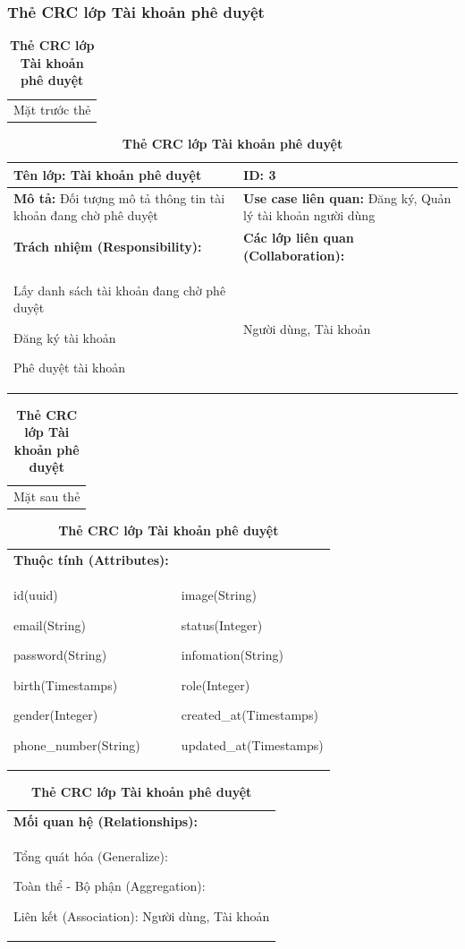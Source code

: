 \subsubsection{Thẻ CRC lớp Tài khoản phê duyệt}
  \begin{table}[H]
    \caption{\bfseries \fontsize{12pt}{0pt}\selectfont Thẻ CRC lớp Tài khoản phê duyệt}
    \centering
    \begin{tabularx}{0.9\textwidth}{X}
      Mặt trước thẻ
    \end{tabularx}
    \begin{tabularx}{0.9\textwidth}{|X|X|}
      \hline
      \textbf{Tên lớp:} Tài khoản phê duyệt & \textbf{ID:} 3 \\
      \hline
      \textbf{Mô tả:} Đối tượng mô tả thông tin tài khoản đang chờ phê duyệt & \textbf{Use case liên quan:} Đăng ký, Quản lý tài khoản người dùng \\
      \hline
      \textbf{Trách nhiệm (Responsibility):} & \textbf{Các lớp liên quan (Collaboration):} \\
      Lấy danh sách tài khoản đang chờ phê duyệt
      
      Đăng ký tài khoản

      Phê duyệt tài khoản
      & 
      Người dùng, Tài khoản
      \\
      \hline
    \end{tabularx}
    \begin{tabularx}{0.9\textwidth}{X}
      Mặt sau thẻ
    \end{tabularx}
    \begin{tabularx}{0.9\textwidth}{|X|X|}
      \hline
      \textbf{Thuộc tính (Attributes):} & \\
      id(uuid) 
      
      email(String)

      password(String)

      birth(Timestamps)

      gender(Integer)

      phone\_number(String)
      &
      image(String)

      status(Integer)

      infomation(String)

      role(Integer)

      created\_at(Timestamps)

      updated\_at(Timestamps)
      \\
      \hline
    \end{tabularx}
    \begin{tabularx}{0.9\textwidth}{|X|}
      \textbf{Mối quan hệ (Relationships):} \\
      Tổng quát hóa (Generalize):  

      Toàn thể - Bộ phận (Aggregation):   
      
      Liên kết (Association): Người dùng, Tài khoản 
      \\
      \hline
    \end{tabularx}
  \end{table}

